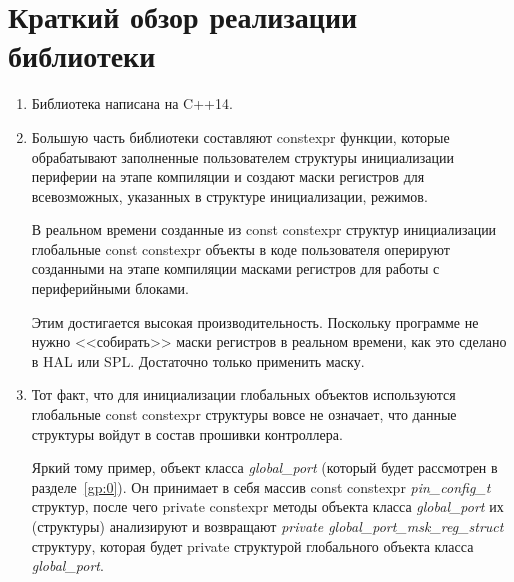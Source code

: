 \chapter{Краткий обзор реализации библиотеки}
\begin{enumerate}
	\item Библиотека написана на C++14. 
	\item Большую часть библиотеки составляют constexpr функции, которые обрабатывают заполненные пользователем структуры инициализации периферии на этапе компиляции и создают маски регистров для всевозможных, указанных в структуре инициализации, режимов.
	
	В реальном времени созданные из const constexpr структур инициализации глобальные const constexpr объекты в коде пользователя оперируют созданными на этапе компиляции масками регистров для работы с периферийными блоками.
	
	Этим достигается высокая производительность. Поскольку программе не нужно <<собирать>> маски регистров в реальном времени, как это сделано в HAL или SPL. Достаточно только применить маску.
	\item Тот факт, что для инициализации глобальных объектов используются глобальные const constexpr структуры вовсе не означает, что данные структуры войдут в состав прошивки контроллера.
	
	Яркий тому пример, объект класса \textit{global\_\-port} (который будет рассмотрен в разделе~\ref{gp:0}). Он принимает в себя массив const constexpr \textit{pin\_config\_t} структур, после чего private constexpr методы объекта класса \textit{global\_\-port} их (структуры) анализируют и возвращают \textit{private global\_\-port\_\-msk\_\-reg\_\-struct} структуру, которая будет private структурой глобального объекта класса \textit{global\_\-port}.
	

\end{enumerate}
